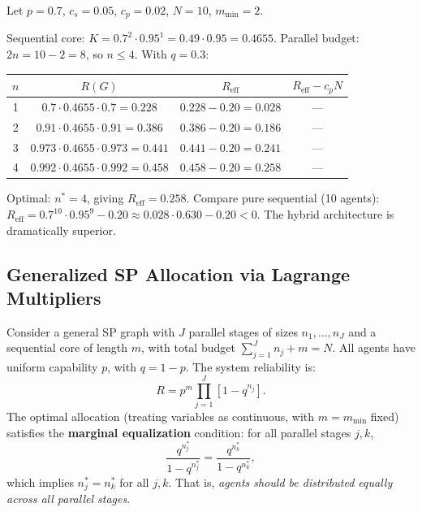 \begin{example}
\label{ex:r4-numerical-allocation}
Let $p = 0.7$, $c_s = 0.05$, $c_p = 0.02$, $N = 10$, $m_{\min} = 2$.

Sequential core: $K = 0.7^2 \cdot 0.95^1 = 0.49 \cdot 0.95 = 0.4655$.
Parallel budget: $2n = 10 - 2 = 8$, so $n \le 4$.  With $q = 0.3$:

\begin{center}
\begin{tabular}{c|c|c|c}
$n$ & $R(G)$ & $R_{\mathrm{eff}}$ & $R_{\mathrm{eff}} - c_p N$ \\
\hline
1 & $0.7 \cdot 0.4655 \cdot 0.7 = 0.228$ & $0.228 - 0.20 = 0.028$ & --- \\
2 & $0.91 \cdot 0.4655 \cdot 0.91 = 0.386$ & $0.386 - 0.20 = 0.186$ & --- \\
3 & $0.973 \cdot 0.4655 \cdot 0.973 = 0.441$ & $0.441 - 0.20 = 0.241$ & --- \\
4 & $0.992 \cdot 0.4655 \cdot 0.992 = 0.458$ & $0.458 - 0.20 = 0.258$ & --- \\
\end{tabular}
\end{center}
Optimal: $n^* = 4$, giving $R_{\mathrm{eff}} = 0.258$.  Compare pure sequential
(10 agents): $R_{\mathrm{eff}} = 0.7^{10} \cdot 0.95^9 - 0.20 \approx 0.028 \cdot 0.630 - 0.20 < 0$.
The hybrid architecture is dramatically superior.
\end{example}

\subsection{Generalized SP Allocation via Lagrange Multipliers}

\begin{theorem}
\label{thm:r4-marginal-equalization}
Consider a general SP graph with $J$ parallel stages of sizes $n_1, \ldots, n_J$
and a sequential core of length $m$, with total budget $\sum_{j=1}^J n_j + m = N$.
All agents have uniform capability $p$, with $q = 1-p$.  The system reliability is:
\[
  R = p^m \prod_{j=1}^{J} [1 - q^{n_j}].
\]
The optimal allocation (treating variables as continuous, with $m = m_{\min}$ fixed)
satisfies the \textbf{marginal equalization} condition: for all parallel stages
$j, k$,
\[
  \frac{q^{n_j^*}}{1 - q^{n_j^*}} = \frac{q^{n_k^*}}{1 - q^{n_k^*}},
\]
which implies $n_j^* = n_k^*$ for all $j, k$.  That is, \emph{agents should be
distributed equally across all parallel stages}.
\end{theorem}

